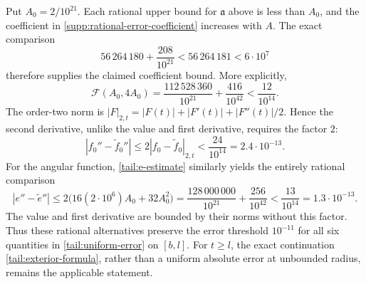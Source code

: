 Put $A_0=2/10^{21}$.  Each rational upper bound for $\mathfrak a$ above is
less than $A_0$, and the coefficient in
\eqref{supp:rational-error-coefficient} increases with $A$.
The exact comparison
\[
 56\,264\,180+\frac{208}{10^{21}}
 <56\,264\,181<6\cdot10^7
\]
therefore supplies the claimed coefficient bound.  More explicitly,
\[
 \mathcal F(A_0,4A_0)
 =\frac{112\,528\,360}{10^{21}}+\frac{416}{10^{42}}
 <\frac{12}{10^{14}}.
\]
The order-two norm is
$|F|_{2,t}=|F(t)|+|F'(t)|+|F''(t)|/2$.  Hence the second derivative,
unlike the value and first derivative, requires the factor $2$:
\[
 |f_0''-\widetilde f_0''|
 \leq2|f_0-\widetilde f_0|_{2,t}
 <\frac{24}{10^{14}}=2.4\cdot10^{-13}.
\]
For the angular function, \eqref{tail:e-estimate} similarly yields the
entirely rational comparison
\[
 |e''-\widetilde e''|
 \leq2\bigl(16(2\cdot10^6)A_0+32A_0^2\bigr)
 =\frac{128\,000\,000}{10^{21}}+\frac{256}{10^{42}}
 <\frac{13}{10^{14}}=1.3\cdot10^{-13}.
\]
The value and first derivative are bounded by their norms without this
factor.  Thus these rational alternatives preserve the error threshold
$10^{-11}$ for all six quantities in \eqref{tail:uniform-error} on $[b,l]$.
For $t\geq l$, the exact continuation \eqref{tail:exterior-formula}, rather
than a uniform absolute error at unbounded radius, remains the applicable
statement.
